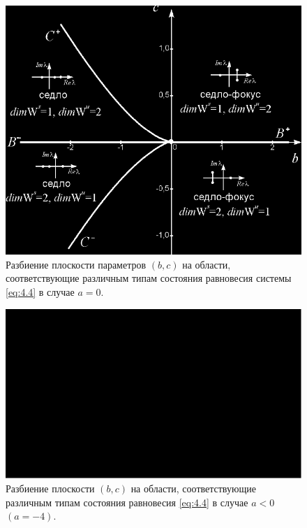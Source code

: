 \begin{figure}[h!]
        \centering
        \includegraphics[width=0.5\linewidth]{fig/lect4/8}
        \caption{Разбиение плоскости параметров $(b,c)$ на области, соответствующие различным типам состояния равновесия системы \eqref{eq:4.4} в случае $a=0$.}
        \label{fig:4.8}
\end{figure}

\begin{figure}[h!]
        \centering
        \includegraphics[width=0.5\linewidth]{fig/lect4/9}
        \caption{Разбиение плоскости $(b,c)$ на области, соответствующие различным типам состояния равновесия \eqref{eq:4.4} в случае $a<0$ $(a=-4)$.}
        \label{fig:4.9}
\end{figure}


